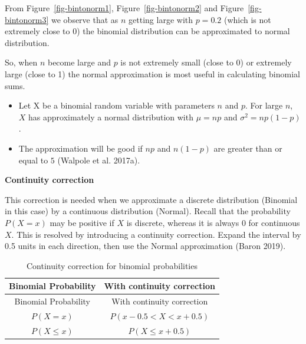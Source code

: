 \documentclass[
  11pt,
  letterpaper,
  DIV=11,
  numbers=noendperiod]{scrreprt}
\begin{document}
From Figure~\ref{fig-bintonorm1}, Figure~\ref{fig-bintonorm2} and
Figure~\ref{fig-bintonorm3} we observe that as \(n\) getting large with
\(p=0.2\) (which is not extremely close to 0) the binomial distribution
can be approximated to normal distribution.

So, when \(n\) become large and \(p\) is not extremely small (close to
0) or extremely large (close to 1) the normal approximation is most
useful in calculating binomial sums.

\begin{tcolorbox}[enhanced jigsaw, bottomrule=.15mm, toprule=.15mm, title=\textcolor{quarto-callout-important-color}{\faExclamation}\hspace{0.5em}{Normal Approximation to the Binomial Distribution}, bottomtitle=1mm, colframe=quarto-callout-important-color-frame, coltitle=black, rightrule=.15mm, toptitle=1mm, colbacktitle=quarto-callout-important-color!10!white, titlerule=0mm, breakable, arc=.35mm, leftrule=.75mm, opacitybacktitle=0.6, opacityback=0, colback=white, left=2mm]

\begin{itemize}
\item
  Let X be a binomial random variable with parameters \(n\) and \(p\).
  For large \(n\), \(X\) has approximately a normal distribution with
  \(\mu = np\) and \(\sigma^2 =np(1-p)\).
\item
  The approximation will be good if \(np\) and \(n(1-p)\) are greater
  than or equal to \(5\) (Walpole et al. 2017a).
\end{itemize}

\end{tcolorbox}

\textbf{Continuity correction}

This correction is needed when we approximate a discrete distribution
(Binomial in this case) by a continuous distribution (Normal). Recall
that the probability \(P(X = x)\) may be positive if \(X\) is discrete,
whereas it is always \(0\) for continuous \(X\). This is resolved by
introducing a continuity correction. Expand the interval by 0.5 units in
each direction, then use the Normal approximation (Baron 2019).

\begin{longtable}[]{@{}cc@{}}
\caption{Continuity correction for binomial
probabilities}\tabularnewline
\toprule\noalign{}
Binomial Probability & With continuity correction \\
\midrule\noalign{}
\endfirsthead
\toprule\noalign{}
Binomial Probability & With continuity correction \\
\midrule\noalign{}
\endhead
\bottomrule\noalign{}
\endlastfoot
\(P(X=x)\) & \(P(x-0.5<X<x+0.5)\) \\
\(P(X\le x)\) & \(P(X\le x+0.5)\) \\
\end{longtable}
\end{document}
